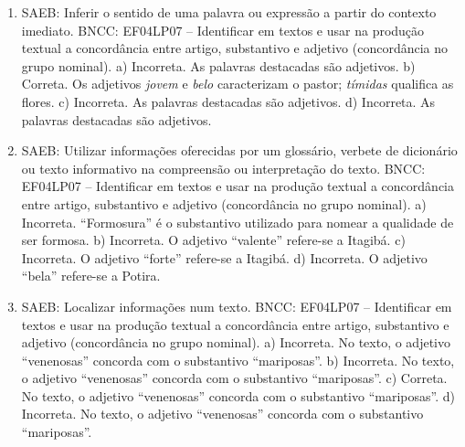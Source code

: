 
\begin{enumerate}
\item
SAEB: Inferir o sentido de uma palavra ou expressão a partir do
contexto imediato.
BNCC: EF04LP07 -- Identificar em textos e usar na produção textual a
concordância entre artigo, substantivo e adjetivo (concordância no grupo
nominal).
a)  Incorreta. As palavras destacadas são adjetivos.
b)  Correta. Os adjetivos \textit{jovem} e \textit{belo} caracterizam o
pastor; \textit{tímidas} qualifica as flores.
c)  Incorreta. As palavras destacadas são adjetivos.
d)  Incorreta. As palavras destacadas são adjetivos.

\item
SAEB: Utilizar informações oferecidas por um glossário, verbete de
dicionário ou texto informativo na compreensão ou interpretação do
texto.
BNCC: EF04LP07 -- Identificar em textos e usar na produção textual a
concordância entre artigo, substantivo e adjetivo (concordância no grupo
nominal).
a) Incorreta. ``Formosura'' é o substantivo utilizado para nomear a qualidade
de ser formosa.
b) Incorreta. O adjetivo ``valente'' refere-se a Itagibá.
c)  Incorreta. O adjetivo ``forte'' refere-se a Itagibá.
d)  Incorreta. O adjetivo ``bela'' refere-se a Potira.

\item
SAEB: Localizar informações num texto.
BNCC: EF04LP07 -- Identificar em textos e usar na produção textual a
concordância entre artigo, substantivo e adjetivo (concordância no grupo
nominal).
a) Incorreta. No texto, o adjetivo ``venenosas'' concorda com o substantivo ``mariposas''.
b) Incorreta. No texto, o adjetivo ``venenosas'' concorda com o substantivo ``mariposas''.
c) Correta. No texto, o adjetivo ``venenosas'' concorda com o substantivo ``mariposas''.
d) Incorreta. No texto, o adjetivo ``venenosas'' concorda com o substantivo ``mariposas''.
\end{enumerate}


